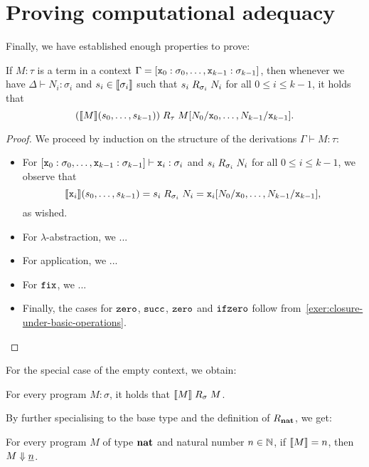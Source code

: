 \begin{corollary}

\end{corollary}


\section{Proving computational adequacy}

Finally, we have established enough properties to prove:
\begin{lemma}\label{fundamental-theorem}
  If \(M : \tau\) is a term in a context
  \(\Gamma = [\mathtt x_0 : \sigma_0 , \dots , \mathtt x_{k-1} : \sigma_{k-1}]\), then
  whenever we have \(\Delta \vdash N_i : \sigma_i\) and
  \(s_i \in \llbracket\sigma_i\rrbracket\) such that \(s_i \mathrel{R}_{\sigma_i} N_i\) for all
  \(0 \leq i \leq k-1\), it holds that
  \[
    \pa*{\densem{M}\pa*{s_0,\dots,s_{k-1}}} \logrel_{\tau} {M[N_0/\var x_0,\dots,N_{k-1}/\var x_{k-1}]}.
  \]
\end{lemma}
\begin{proof}
  We proceed by induction on the structure of the derivations
  \(\Gamma \vdash M : \tau\):

  \begin{itemize}
  \item For
    \([\mathtt x_0 : \sigma_0,\dots,\mathtt x_{k-1} : \sigma_{k-1}] \vdash \mathtt x_i :
    \sigma_i\) and \(s_i \mathrel{R}_{\sigma_i} N_i\) for all
    \(0 \leq i \leq k-1\), we observe that
    \[ {\llbracket\mathtt x_i\rrbracket(s_0,\dots,s_{k-1})} = {s_i} \mathrel{R}_{\sigma_i} {N_i} =
      {{\mathtt x_i}[N_0/\mathtt x_0,\dots,N_{k-1}/\mathtt x_{k-1}]},
    \]
    as wished.
  \item For \(\lambda\)-abstraction, we ...
  \item For application, we ...
  \item
    For \(\operatorname{\mathtt{fix}}\), we ...
  \item Finally, the cases for \(\mathtt{zero}\), \(\operatorname{\mathtt{succ}}\), \(\mathtt{zero}\) and
    \(\operatorname{\mathtt{ifzero}}\) follow from~\cref{exer:closure-under-basic-operations}. \qedhere
  \end{itemize}
\end{proof}

For the special case of the empty context, we obtain:
\begin{corollary}
  For every program \(M : \sigma\), it holds that
  \(\llbracket M\rrbracket \mathrel{R}_\sigma M\).
\end{corollary}
%
By further specialising to the base type and the definition of
\(\mathrel{R}_\mathtt{\mathbf{nat}}\), we get:
\begin{theorem}\label{adequacy}
  For every program \(M\) of type \(\mathtt{\mathbf{nat}}\) and natural number \(n \in \mathbb N\),
  if \(\llbracket M\rrbracket = n\), then \(M \Downarrow \underline{n}\).
\end{theorem}


